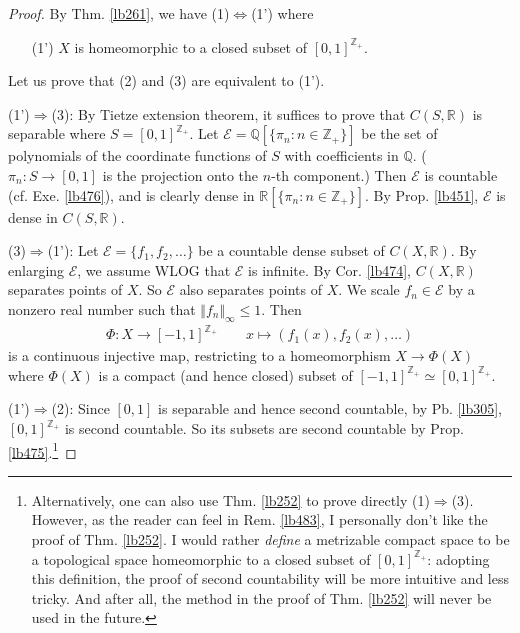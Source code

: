 \documentclass[12pt,b5paper,notitlepage]{article}
\theoremstyle{definition}
\theoremstyle{plain}
\newcommand{\mc}{\mathcal}
\newcommand{\Zbb}{\mathbb Z}
\newcommand{\Qbb}{\mathbb Q}
\newcommand{\Rbb}{\mathbb R}
\numberwithin{equation}{section}
\begin{document}
\begin{proof}
By Thm. \ref{lb261}, we have (1)$\Leftrightarrow$(1') where
\begin{itemize}
\item[(1')] $X$ is homeomorphic to a closed subset of $[0,1]^{\Zbb_+}$. 
\end{itemize}
Let us prove that (2) and (3) are equivalent to (1').

(1')$\Rightarrow$(3): By Tietze extension theorem, it suffices to prove that $C(S,\Rbb)$ is separable where $S=[0,1]^{\Zbb_+}$. Let $\mc E=\Qbb[\{\pi_n:n\in\Zbb_+\}]$ be the set of polynomials of the coordinate functions of $S$ with coefficients in $\Qbb$. ($\pi_n:S\rightarrow[0,1]$ is the projection onto the $n$-th component.) Then $\mc E$ is countable (cf. Exe. \ref{lb476}), and is clearly dense in $\Rbb[\{\pi_n:n\in\Zbb_+\}]$. By Prop. \ref{lb451}, $\mc E$ is dense in $C(S,\Rbb)$.



(3)$\Rightarrow$(1'): Let $\mc E=\{f_1,f_2,\dots\}$ be a countable dense subset of $C(X,\Rbb)$. By enlarging $\mc E$, we assume WLOG that $\mc E$ is infinite. By Cor. \ref{lb474}, $C(X,\Rbb)$ separates points of $X$. So $\mc E$ also separates points of $X$. We scale $f_n\in\mc E$ by a nonzero real number such that $\Vert f_n\Vert_\infty\leq 1$. Then 
\begin{gather}
\Phi:X\rightarrow [-1,1]^{\Zbb_+} \qquad x\mapsto (f_1(x),f_2(x),\dots)  \label{eq199}
\end{gather}
is a continuous injective map, restricting to a homeomorphism $X\rightarrow\Phi(X)$ where $\Phi(X)$ is a compact (and hence closed) subset of $[-1,1]^{\Zbb_+}\simeq[0,1]^{\Zbb_+}$.

(1')$\Rightarrow$(2): Since $[0,1]$ is separable and hence second countable, by Pb. \ref{lb305}, $[0,1]^{\Zbb_+}$ is second countable. So its subsets are second countable by Prop. \ref{lb475}.\footnote{Alternatively, one can also use Thm. \ref{lb252} to prove directly (1)$\Rightarrow$(3). However, as the reader can feel in Rem. \ref{lb483}, I personally don't like the proof of Thm. \ref{lb252}. I would rather \textit{define} a metrizable compact space to be a topological space homeomorphic to a closed subset of $[0,1]^{\Zbb_+}$: adopting this definition, the proof of second countability will be more intuitive and less tricky. And after all, the method in the proof of Thm. \ref{lb252} will never be used in the future.}


\end{proof}
\end{document}

